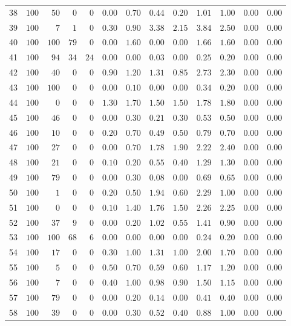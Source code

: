 \documentclass{article}
\begin{document}
\begin{landscape}
\begin{longtable}{lrrrrrrrrrrrr}
38&$100$&$ 50$&$  0$&$  0$&$0.00$&$0.70$&$0.44$&$0.20$&$1.01$&$1.00$&$0.00$&$0.00$\\
39&$100$&$  7$&$  1$&$  0$&$0.30$&$0.90$&$3.38$&$2.15$&$3.84$&$2.50$&$0.00$&$0.00$\\
40&$100$&$100$&$ 79$&$  0$&$0.00$&$1.60$&$0.00$&$0.00$&$1.66$&$1.60$&$0.00$&$0.00$\\
41&$100$&$ 94$&$ 34$&$ 24$&$0.00$&$0.00$&$0.03$&$0.00$&$0.25$&$0.20$&$0.00$&$0.00$\\
42&$100$&$ 40$&$  0$&$  0$&$0.90$&$1.20$&$1.31$&$0.85$&$2.73$&$2.30$&$0.00$&$0.00$\\
43&$100$&$100$&$  0$&$  0$&$0.00$&$0.10$&$0.00$&$0.00$&$0.34$&$0.20$&$0.00$&$0.00$\\
44&$100$&$  0$&$  0$&$  0$&$1.30$&$1.70$&$1.50$&$1.50$&$1.78$&$1.80$&$0.00$&$0.00$\\
45&$100$&$ 46$&$  0$&$  0$&$0.00$&$0.30$&$0.21$&$0.30$&$0.53$&$0.50$&$0.00$&$0.00$\\
46&$100$&$ 10$&$  0$&$  0$&$0.20$&$0.70$&$0.49$&$0.50$&$0.79$&$0.70$&$0.00$&$0.00$\\
47&$100$&$ 27$&$  0$&$  0$&$0.00$&$0.70$&$1.78$&$1.90$&$2.22$&$2.40$&$0.00$&$0.00$\\
48&$100$&$ 21$&$  0$&$  0$&$0.10$&$0.20$&$0.55$&$0.40$&$1.29$&$1.30$&$0.00$&$0.00$\\
49&$100$&$ 79$&$  0$&$  0$&$0.00$&$0.30$&$0.08$&$0.00$&$0.69$&$0.65$&$0.00$&$0.00$\\
50&$100$&$  1$&$  0$&$  0$&$0.20$&$0.50$&$1.94$&$0.60$&$2.29$&$1.00$&$0.00$&$0.00$\\
51&$100$&$  0$&$  0$&$  0$&$0.10$&$1.40$&$1.76$&$1.50$&$2.26$&$2.25$&$0.00$&$0.00$\\
52&$100$&$ 37$&$  9$&$  0$&$0.00$&$0.20$&$1.02$&$0.55$&$1.41$&$0.90$&$0.00$&$0.00$\\
53&$100$&$100$&$ 68$&$  6$&$0.00$&$0.00$&$0.00$&$0.00$&$0.24$&$0.20$&$0.00$&$0.00$\\
54&$100$&$ 17$&$  0$&$  0$&$0.30$&$1.00$&$1.31$&$1.00$&$2.00$&$1.70$&$0.00$&$0.00$\\
55&$100$&$  5$&$  0$&$  0$&$0.50$&$0.70$&$0.59$&$0.60$&$1.17$&$1.20$&$0.00$&$0.00$\\
56&$100$&$  7$&$  0$&$  0$&$0.40$&$1.00$&$0.98$&$0.90$&$1.50$&$1.15$&$0.00$&$0.00$\\
57&$100$&$ 79$&$  0$&$  0$&$0.00$&$0.20$&$0.14$&$0.00$&$0.41$&$0.40$&$0.00$&$0.00$\\
58&$100$&$ 39$&$  0$&$  0$&$0.00$&$0.30$&$0.52$&$0.40$&$0.88$&$1.00$&$0.00$&$0.00$\\

\end{longtable}
\end{landscape}
\end{document}
